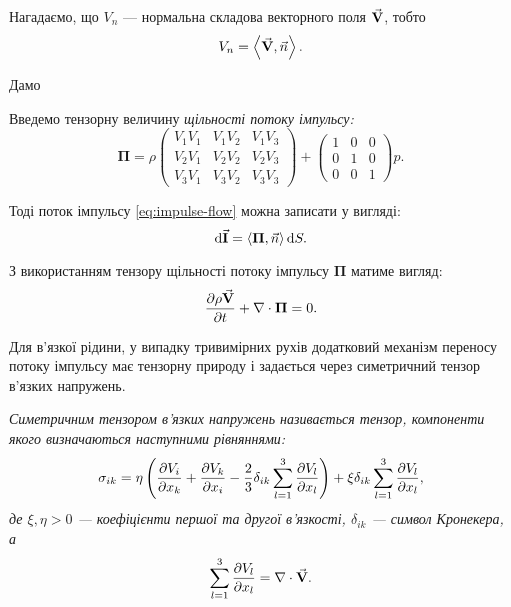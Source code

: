 \begin{remark}
	Нагадаємо, що $V_n$ --- нормальна складова векторного поля ${\vec{\mathbf{V}}}$, тобто
	\begin{equation}
		V_n = \langle \vecf V, \vec n \rangle.
	\end{equation}
\end{remark}

Дамо
\begin{definition}
	Введемо тензорну величину \it{щільності потоку імпульсу}:
	\begin{equation}
		\bm{\Pi} = \rho 
		\begin{pmatrix}
			V_1 V_1 & V_1 V_2 & V_1 V_3 \\
			V_2 V_1 & V_2 V_2 & V_2 V_3 \\
			V_3 V_1 & V_3 V_2 & V_3 V_3
		\end{pmatrix}
		+
		\begin{pmatrix}
			1 & 0 & 0 \\
			0 & 1 & 0 \\
			0 & 0 & 1
		\end{pmatrix}
		p.
	\end{equation}
\end{definition}

Тоді поток імпульсу \eqref{eq:impulse-flow} можна записати у вигляді: 
\begin{equation}
	\diff \vecf I = \langle \bm{\Pi}, \vec n \rangle \diff S.
\end{equation}

\begin{law}
	\label{law:impulse-conservation-ideal-liquid}
	З використанням тензору щільності потоку імпульсу $\bm{\Pi}$ матиме вигляд:
	\begin{equation}
		\label{eq:impulse-conservation-ideal-liquid}
		\frac{\partial \rho {\vec{\mathbf{V}}}}{\partial t} + \nabla \cdot \bm{\Pi} = 0.
	\end{equation}
\end{law}

Для в'язкої рідини, у випадку тривимірних рухів додатковий механізм переносу потоку імпульсу має тензорну природу і задається через симетричний тензор в'язких напружень.

\begin{definition}
	\it{Симетричним тензором в'язких напружень} називається тензор, компоненти якого визначаються наступними рівняннями: 
	\begin{equation}
		\sigma_{ik} = \eta \left( \frac{\partial V_i}{\partial x_k} + \frac{\partial V_k}{\partial x_i} - \frac{2}{3} \delta_{ik} \displaystyle\sum\limits_{l = 1}^3 \frac{\partial V_l}{\partial x_l}\right) + \xi \delta_{ik} \displaystyle\sum\limits_{l = 1}^3 \frac{\partial V_l}{\partial x_l},
	\end{equation}
	де $\xi, \eta > 0$ --- коефіцієнти першої та другої в'язкості, $\delta_{ik}$ --- символ Кронекера, а
	\begin{equation}
		\displaystyle\sum\limits_{l = 1}^3 \frac{\partial V_l}{\partial x_l} = \nabla \cdot {\vec{\mathbf{V}}}.
	\end{equation}
\end{definition}

